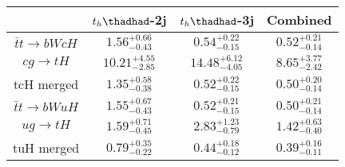 \centering
\begin{tabular}{|c|c|c|c|} \hline
 & $t_h\thadhad$-2j & $t_h\thadhad$-3j & Combined\\\hline
$\bar{t}t\to bWcH$ & $1.56^{+0.66}_{-0.43}$ & $0.54^{+0.22}_{-0.15}$ & $0.52^{+0.21}_{-0.14}$\\\hline
$cg\to tH$ & $10.21^{+4.55}_{-2.85}$ & $14.48^{+6.12}_{-4.05}$ & $8.65^{+3.77}_{-2.42}$\\\hline
tcH merged & $1.35^{+0.58}_{-0.38}$ & $0.52^{+0.22}_{-0.15}$ & $0.50^{+0.20}_{-0.14}$\\\hline
$\bar{t}t\to bWuH$ & $1.55^{+0.67}_{-0.43}$ & $0.52^{+0.21}_{-0.15}$ & $0.50^{+0.21}_{-0.14}$\\\hline
$ug\to tH$ & $1.59^{+0.71}_{-0.45}$ & $2.83^{+1.23}_{-0.79}$ & $1.42^{+0.63}_{-0.40}$\\\hline
tuH merged & $0.79^{+0.35}_{-0.22}$ & $0.44^{+0.18}_{-0.12}$ & $0.39^{+0.16}_{-0.11}$\\\hline
\end{tabular}

